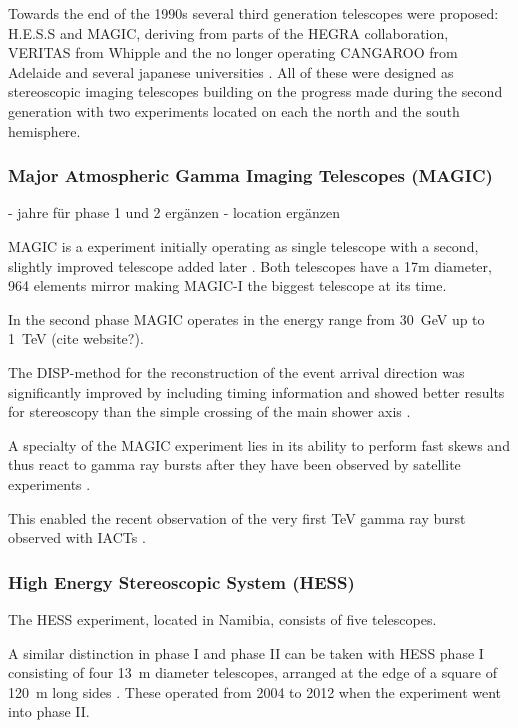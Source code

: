Towards the end of the 1990s several third generation telescopes were
proposed:
H.E.S.S and MAGIC, deriving from parts of the HEGRA collaboration, 
VERITAS from Whipple and the no longer operating CANGAROO from Adelaide and 
several japanese universities \cite{HILLAS201319}.
All of these were designed as stereoscopic imaging telescopes building on the progress made during the 
second generation with two experiments located on each the north and the south hemisphere.

\subsubsection{Major Atmospheric Gamma Imaging Telescopes (MAGIC)}
- jahre für phase 1 und 2 ergänzen
- location ergänzen

MAGIC is a experiment initially operating as single telescope with a second, slightly improved 
telescope added later \cite{BAIXERAS2003247}.
Both telescopes have a 17m diameter, 964 elements mirror making MAGIC-I the biggest 
telescope at its time.

In the second phase MAGIC operates in the energy range from \SI{30}{\giga\eV}
up to \SI{1}{\TeV} (cite website?).

The DISP-method for the reconstruction of the event arrival direction 
was significantly improved by including timing information and showed better 
results for stereoscopy than the simple crossing of the main shower axis \cite{ALEKSIC2012345}.

A specialty of the MAGIC experiment lies in its ability to 
perform fast skews and thus react to gamma ray bursts after they have been observed 
by satellite experiments \cite{2003ICRC....5.2943B}.

This enabled the recent observation of the very first \si{\TeV}
gamma ray burst observed with IACTs \cite{collaboration2019teraelectronvolt}.


\subsubsection{High Energy Stereoscopic System (HESS)}

The HESS experiment, located in Namibia,  consists of five telescopes.

A similar distinction in phase I and phase II can be taken with 
HESS phase I consisting of four \SI{13}{\meter} diameter telescopes,
arranged at the edge of a square of \SI{120}{\meter} long sides \cite{HINTON2004331}.
These operated from 2004 to 2012 when the experiment went into phase II.

